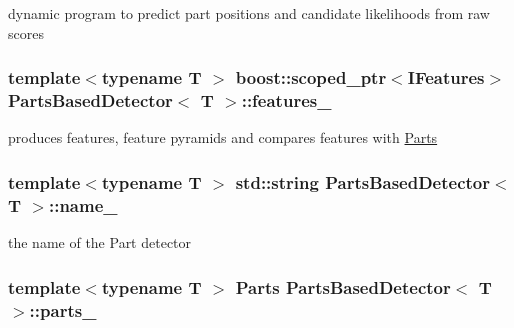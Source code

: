 dynamic program to predict part positions and candidate likelihoods from raw scores 

\hypertarget{class_parts_based_detector_a6242f9b02fcb1a440cc431f2fc15521f}{
\subsubsection[{features\-\_\-}]{\setlength{\rightskip}{0pt plus 5cm}template$<$typename T $>$ boost\-::scoped\-\_\-ptr$<${\bf I\-Features}$>$ {\bf Parts\-Based\-Detector}$<$ T $>$\-::features\-\_\-\hspace{0.3cm}{\ttfamily [private]}}}\label{class_parts_based_detector_a6242f9b02fcb1a440cc431f2fc15521f}


produces features, feature pyramids and compares features with \hyperlink{class_parts}{Parts} 

\hypertarget{class_parts_based_detector_a776c766541fb4c2974c6b40a8f4f1c2f}{
\subsubsection[{name\-\_\-}]{\setlength{\rightskip}{0pt plus 5cm}template$<$typename T $>$ std\-::string {\bf Parts\-Based\-Detector}$<$ T $>$\-::name\-\_\-\hspace{0.3cm}{\ttfamily [private]}}}\label{class_parts_based_detector_a776c766541fb4c2974c6b40a8f4f1c2f}


the name of the Part detector 

\hypertarget{class_parts_based_detector_ad548ec9214858535eb6a0f3783d11664}{
\subsubsection[{parts\-\_\-}]{\setlength{\rightskip}{0pt plus 5cm}template$<$typename T $>$ {\bf Parts} {\bf Parts\-Based\-Detector}$<$ T $>$\-::parts\-\_\-\hspace{0.3cm}{\ttfamily [private]}}}\label{class_parts_based_detector_ad548ec9214858535eb6a0f3783d11664}


